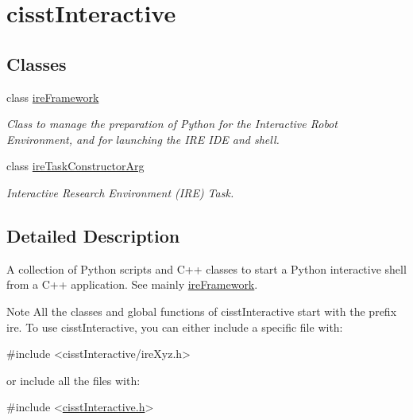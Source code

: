 \hypertarget{group__cisst_interactive}{}\section{cisst\+Interactive}
\label{group__cisst_interactive}
\subsection*{Classes}
\begin{DoxyCompactItemize}
\item 
class \hyperlink{classire_framework}{ire\+Framework}
\begin{DoxyCompactList}\small\item\em Class to manage the preparation of Python for the Interactive Robot Environment, and for launching the I\+R\+E I\+D\+E and shell. \end{DoxyCompactList}\item 
class \hyperlink{classire_task_constructor_arg}{ire\+Task\+Constructor\+Arg}
\begin{DoxyCompactList}\small\item\em Interactive Research Environment (I\+R\+E) Task. \end{DoxyCompactList}\end{DoxyCompactItemize}


\subsection{Detailed Description}
A collection of Python scripts and C++ classes to start a Python interactive shell from a C++ application. See mainly \hyperlink{classire_framework}{ire\+Framework}.

\begin{DoxyNote}{Note}
All the classes and global functions of cisst\+Interactive start with the prefix ire. To use cisst\+Interactive, you can either include a specific file with\+: 
\begin{DoxyCode}
\textcolor{preprocessor}{#include <cisstInteractive/ireXyz.h>}
\end{DoxyCode}
 or include all the files with\+: 
\begin{DoxyCode}
\textcolor{preprocessor}{#include <\hyperlink{cisst_interactive_8h}{cisstInteractive.h}>}
\end{DoxyCode}
 
\end{DoxyNote}

